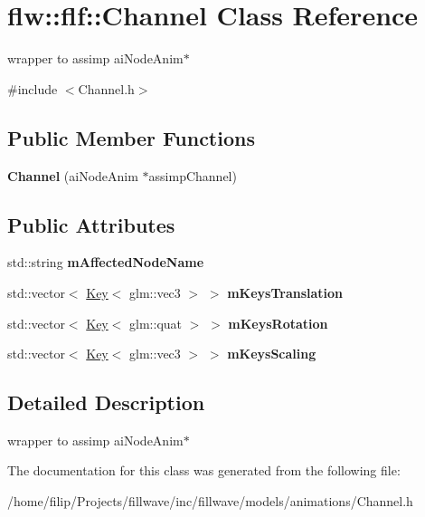 \hypertarget{classflw_1_1flf_1_1Channel}{}\section{flw\+:\+:flf\+:\+:Channel Class Reference}
\label{classflw_1_1flf_1_1Channel}


wrapper to assimp ai\+Node\+Anim$\ast$  




{\ttfamily \#include $<$Channel.\+h$>$}

\subsection*{Public Member Functions}
\begin{DoxyCompactItemize}
\item 
{\bfseries Channel} (ai\+Node\+Anim $\ast$assimp\+Channel)\hypertarget{classflw_1_1flf_1_1Channel_a68388e17e6a802feb500298f6ebae8b7}{}\label{classflw_1_1flf_1_1Channel_a68388e17e6a802feb500298f6ebae8b7}

\end{DoxyCompactItemize}
\subsection*{Public Attributes}
\begin{DoxyCompactItemize}
\item 
std\+::string {\bfseries m\+Affected\+Node\+Name}\hypertarget{classflw_1_1flf_1_1Channel_a2be55ddd58a96c0e5f75e27ee5ece8c0}{}\label{classflw_1_1flf_1_1Channel_a2be55ddd58a96c0e5f75e27ee5ece8c0}

\item 
std\+::vector$<$ \hyperlink{classflw_1_1flf_1_1Key}{Key}$<$ glm\+::vec3 $>$ $>$ {\bfseries m\+Keys\+Translation}\hypertarget{classflw_1_1flf_1_1Channel_a5c976df532a44512d02002054c6fc7db}{}\label{classflw_1_1flf_1_1Channel_a5c976df532a44512d02002054c6fc7db}

\item 
std\+::vector$<$ \hyperlink{classflw_1_1flf_1_1Key}{Key}$<$ glm\+::quat $>$ $>$ {\bfseries m\+Keys\+Rotation}\hypertarget{classflw_1_1flf_1_1Channel_a878c9d16a562846be380bf1539da775b}{}\label{classflw_1_1flf_1_1Channel_a878c9d16a562846be380bf1539da775b}

\item 
std\+::vector$<$ \hyperlink{classflw_1_1flf_1_1Key}{Key}$<$ glm\+::vec3 $>$ $>$ {\bfseries m\+Keys\+Scaling}\hypertarget{classflw_1_1flf_1_1Channel_a85e59bc7ef520eab7656af136bc9d43c}{}\label{classflw_1_1flf_1_1Channel_a85e59bc7ef520eab7656af136bc9d43c}

\end{DoxyCompactItemize}


\subsection{Detailed Description}
wrapper to assimp ai\+Node\+Anim$\ast$ 

The documentation for this class was generated from the following file\+:\begin{DoxyCompactItemize}
\item 
/home/filip/\+Projects/fillwave/inc/fillwave/models/animations/Channel.\+h\end{DoxyCompactItemize}
